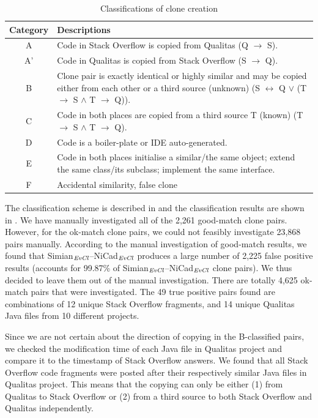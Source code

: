 \documentclass{sig-alternate-05-2015}
\begin{document}
\begin{table}
	\centering
	\caption{Classifications of clone creation}
	\label{tab:classification_scheme}
	\begin{tabular}{|c|p{13cm}|}
		\hline 
		Category & Descriptions \\ 
		\hline 
		A & Code in Stack Overflow is copied from Qualitas (Q $\rightarrow$ S). \\ 
		\hline 
		A' & Code in Qualitas is copied from Stack Overflow (S $\rightarrow$ Q). \\ 
		\hline 
		B & Clone pair is exactly identical or highly similar and may be copied either from each other or a third source (unknown) (S $\leftrightarrow$ Q $\vee$ (T $\rightarrow$ S $\wedge$ T $\rightarrow$ Q)).
		\\ 
		\hline 
		C & Code in both places are copied from a third source T (known) (T $\rightarrow$ S $\wedge$ T $\rightarrow$ Q).
		\\ 
		\hline 
		D & Code is a boiler-plate or IDE auto-generated.
		\\ 
		\hline 
		E & Code in both places initialise a similar/the same object; extend the same class/its subclass; implement the same interface.
		\\ 
		\hline 
		F & Accidental similarity, false clone \\ 
		\hline 
	\end{tabular} 
\end{table}

The classification scheme is described in  and the classification results are shown in . We have manually investigated all of the 2,261 good-match clone pairs.  However, for the ok-match clone pairs, we could not feasibly investigate 23,868 pairs manually.  According to the manual investigation of good-match results, we found that Simian$_{\textrm{\textit{EvCl}}}$--NiCad$_{\textrm{\textit{EvCl}}}$ produces a large number of 2,225 false positive results (accounts for 99.87\% of Simian$_{\textrm{\textit{EvCl}}}$--NiCad$_{\textrm{\textit{EvCl}}}$ clone pairs). We thus decided to leave them out of the manual investigation. There are totally 4,625 ok-match pairs that were investigated. The 49 true positive pairs found are combinations of 12 unique Stack Overflow fragments, and 14 unique Qualitas Java files from 10 different projects.

Since we are not certain about the direction of copying in the B-classified pairs, we checked the modification time of each Java file in Qualitas project and compare it to the timestamp of Stack Overflow answers. We found that all Stack Overflow code fragments were posted after their respectively similar Java files in Qualitas project. This means that the copying can only be either (1) from Qualitas to Stack Overflow or (2) from a third source to both Stack Overflow and Qualitas independently.
\end{document}
